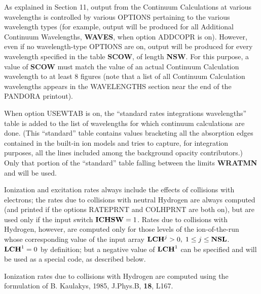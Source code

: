 \space \noindent
As explained in Section 11, output from the Continuum Calculations at various
wavelengths is controlled by various OPTIONS pertaining to the various
wavelength types (for example, output will be produced for all Additional
Continuum Wavelengths, {\bf WAVES}, when option ADDCOPR is on). However,
even if no wavelength-type OPTIONS are on, output will be produced for
every wavelength specified in the table {\bf SCOW}, of length {\bf NSW}.
For this purpose, a value of {\bf SCOW} must match the value of an actual
Continuum Calculation wavelength to at least 8 figures (note that a list
of all Continuum Calculation wavelengths appears in the WAVELENGTHS section
near the end of the PANDORA printout).
\blankline
\blankline
\centerline{}
\space \noindent
When option USEWTAB is on, the ``standard rates integrations wavelengths''
table is added to the list of wavelengths for which continuum calculations
are done. (This ``standard'' table contains values bracketing all the
absorption edges contained in the built-in ion models and tries to
capture, for integration purposes, all the lines included among the 
background opacity contributors.) Only that portion of the ``standard''
table falling between the limits {\bf WRATMN} and
 will be used.
\ej
\centerline{}
\space \noindent
Ionization and excitation rates always include the effects of collisions
with electrons; the rates due to collisions with neutral Hydrogen are
always computed (and printed if the options RATEPRNT and COLHPRNT are
both on), but are used only if the input switch ${\bf ICHSW} = 1$.
Rates due to collisions with Hydrogen, however, are computed only for
those levels of the ion-of-the-run whose corresponding value of the
input array ${\bf LCH}^j > 0, \; 1 \leq j \leq {\bf NSL}$.
${\bf LCH}^1 = 0$ by definition; but a negative value of ${\bf LCH}^1$
can be specified and will be used as a special code, as described below.

Ionization rates due to collisions with Hydrogen are computed using the
formulation of B. Kaulakys, 1985, J.Phys.B, {\bf 18}, L167.

